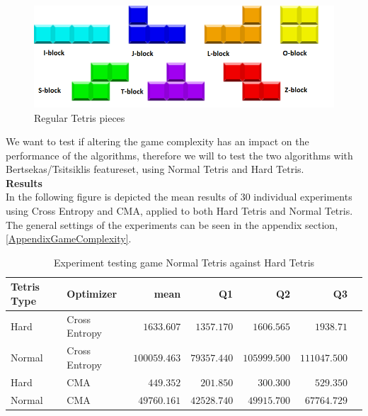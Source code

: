 \begin{figure}[H]
\begin{center}
\includegraphics[scale=0.6]{img/Pieces}
\end{center}
\caption{Regular Tetris pieces \label{fig:TetrisPieces}}
\end{figure}

We want to test if altering the game complexity has an impact on the performance of the algorithms,
therefore we will to test the two algorithms with Bertsekas/Tsitsiklis featureset, using Normal Tetris and Hard Tetris.\\

\textbf{Results}\\
In the following figure is depicted the mean results of 30 individual experiments using Cross Entropy and CMA, applied to both Hard Tetris and Normal Tetris. The general settings of the experiments can be seen in the appendix section, \ref{AppendixGameComplexity}.

\begin{table}[H]
\centering
\small
\begin{tabular}{l l r r r r r}
Tetris Type & Optimizer & mean & Q1 & Q2 & Q3\\
\hline
Hard & Cross Entropy & $1633.607$ & $1357.170$ & $1606.565$ & $1938.71$\\
Normal & Cross Entropy & $100059.463$ & $79357.440$ & $105999.500$ & $111047.500$\\
Hard & CMA & $449.352$ & $201.850$ & $300.300$ & $529.350$\\
Normal & CMA & $49760.161$ & $42528.740$ & $49915.700$ & $67764.729$\\
\end{tabular}
\caption{Experiment testing game Normal Tetris against Hard Tetris}
\end{table}


